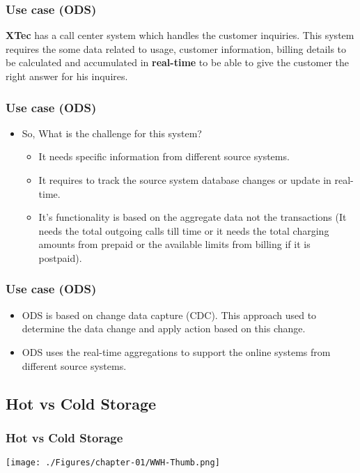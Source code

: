 \begin{frame}
\frametitle{Use case (ODS)}
\centering
\textbf{XTec} has a call center system which handles the customer inquiries. This system requires the some data related to usage, customer information, billing details to be calculated and accumulated in \textbf{real-time} to be able to give the customer the right answer for his inquires.

\end{frame}
\begin{frame}
\frametitle{Use case (ODS)}

	\begin{itemize}[<+->]
		\item So, What is the challenge for this system?
			\begin{itemize}[<+->]		
				\item It needs specific information from different source systems.
				\item It requires to track the source system database changes or update in real-time.
				\item It's functionality is based on the aggregate data not the transactions \forexample (It needs the total outgoing calls till time or it needs the total charging amounts from prepaid or the available limits from billing if it is postpaid).
			\end{itemize}
	\end{itemize}

\end{frame}
\begin{frame}
\frametitle{Use case (ODS)}

	\begin{itemize}[<+->]
		\item ODS is based on change data capture (CDC). This approach used to determine the data change and apply action based on this change.
		\item ODS uses the real-time aggregations to support the online systems from different source systems.
	\end{itemize}
\end{frame}


\VideoClassification[column=2, colour=red]

\subsection{Hot vs Cold Storage}
\begin{frame}[c]
\frametitle{Hot vs Cold Storage}

\texttt{[image: ./Figures/chapter-01/WWH-Thumb.png]}



\end{frame}


